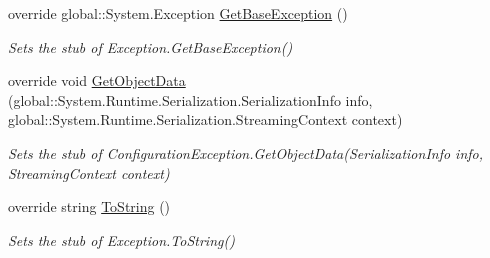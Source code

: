 \begin{DoxyCompactItemize}
override global\-::\-System.\-Exception \hyperlink{class_system_1_1_configuration_1_1_fakes_1_1_stub_configuration_exception_abc96ed3b9d6c0cdfe9341de641a4b01a}{Get\-Base\-Exception} ()
\begin{DoxyCompactList}\small\item\em Sets the stub of Exception.\-Get\-Base\-Exception()\end{DoxyCompactList}\item 
override void \hyperlink{class_system_1_1_configuration_1_1_fakes_1_1_stub_configuration_exception_a274a5321a4730b6e85619be19e53f3d8}{Get\-Object\-Data} (global\-::\-System.\-Runtime.\-Serialization.\-Serialization\-Info info, global\-::\-System.\-Runtime.\-Serialization.\-Streaming\-Context context)
\begin{DoxyCompactList}\small\item\em Sets the stub of Configuration\-Exception.\-Get\-Object\-Data(\-Serialization\-Info info, Streaming\-Context context)\end{DoxyCompactList}\item 
override string \hyperlink{class_system_1_1_configuration_1_1_fakes_1_1_stub_configuration_exception_ad8789d3a7017accac6f88a7eaa216d42}{To\-String} ()
\begin{DoxyCompactList}\small\item\em Sets the stub of Exception.\-To\-String()\end{DoxyCompactList}\end{DoxyCompactItemize}
